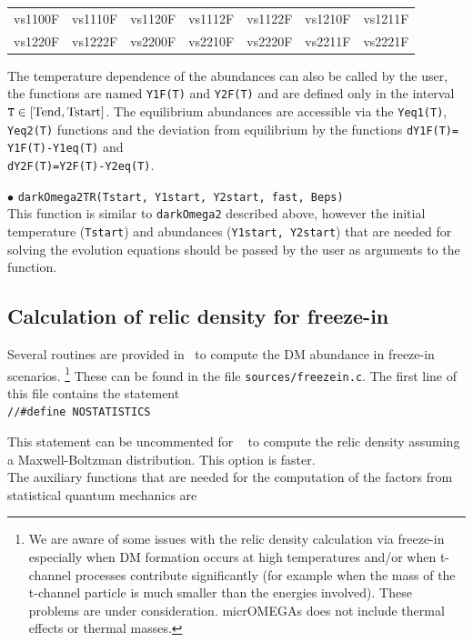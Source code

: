 \documentclass[12pt,a4paper]{article}
\begin{document}
\begin{center}
\begin{tabular}{ l l l l l l l }
vs1100F & vs1110F & vs1120F&vs1112F&vs1122F&vs1210F&vs1211F\\
vs1220F&vs1222F&vs2200F&vs2210F&vs2220F&vs2211F& vs2221F
\end{tabular}
\end{center} 

The  temperature dependence  of the abundances can also be called by the user, the functions are named {\tt Y1F(T)} and {\tt Y2F(T)} and are defined only in the  interval ${\tt T}\in
[\rm{Tend},\rm{Tstart}]$. The equilibrium abundances are accessible via  the  { \tt Yeq1(T)}, { \tt Yeq2(T)} functions and the deviation from equilibrium  
by the functions
 {\tt dY1F(T)= Y1F(T)-Y1eq(T)}  and \\
   { \tt dY2F(T)=Y2F(T)-Y2eq(T)}.

\noindent
$\bullet$ \verb|darkOmega2TR(Tstart, Y1start, Y2start, fast, Beps)|\\
This function is similar to \verb|darkOmega2| described above, however the initial temperature (\verb|Tstart|) and abundances (\verb|Y1start, Y2start|) that are needed for solving the evolution equations should be  passed by the user as arguments to the function. 


\subsection{Calculation of relic density for freeze-in}
\label{sec:routines} 

Several routines are provided in \micro~to compute the DM abundance in freeze-in scenarios. 
\footnote{We are aware of some issues with the relic density calculation via freeze-in especially when DM formation occurs at high temperatures and/or when t-channel processes contribute significantly (for example when the mass of the t-channel particle is much smaller than the energies involved). These problems are under consideration. micrOMEGAs does not include thermal effects or thermal masses. } 
These can be found in the file \verb|sources/freezein.c|. The first line of this file contains the statement \\
\verb|//#define NOSTATISTICS|

\noindent
This statement can be uncommented for \micro~ to compute the relic density assuming a Maxwell-Boltzman distribution. This option is faster. 
\\
The auxiliary functions that are needed for the computation of the factors from statistical quantum mechanics are 
\end{document}
